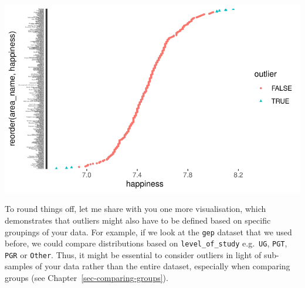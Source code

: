 \documentclass[
  letterpaper,
]{krantz}
\begin{document}
\includegraphics{09_sources_of_bias_files/figure-pdf/plot-outliers-different-format-1.pdf}

To round things off, let me share with you one more visualisation, which
demonstrates that outliers might also have to be defined based on
specific groupings of your data. For example, if we look at the
\texttt{gep} dataset that we used before, we could compare distributions
based on \texttt{level\_of\_study} e.g.~\texttt{UG}, \texttt{PGT},
\texttt{PGR} or \texttt{Other}. Thus, it might be essential to consider
outliers in light of sub-samples of your data rather than the entire
dataset, especially when comparing groups (see
Chapter~\ref{sec-comparing-groups}).
\end{document}
